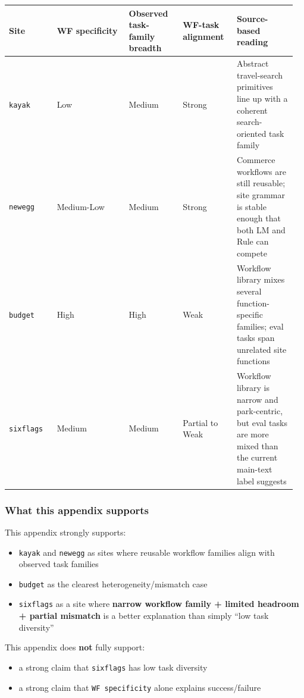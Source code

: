 {\def\LTcaptype{} %
\begin{longtable}[]{@{}>{\raggedright\arraybackslash}p{0.16\linewidth}>{\raggedright\arraybackslash}p{0.24\linewidth}>{\raggedright\arraybackslash}p{0.18\linewidth}>{\raggedright\arraybackslash}p{0.18\linewidth}>{\raggedright\arraybackslash}p{0.20\linewidth}@{}}
\toprule\noalign{}
Site & WF specificity & Observed task-family breadth & WF-task alignment
& Source-based reading \\
\midrule\noalign{}
\endhead
\bottomrule\noalign{}
\endlastfoot
\texttt{kayak} & Low & Medium & Strong & Abstract travel-search
primitives line up with a coherent search-oriented task family \\
\texttt{newegg} & Medium-Low & Medium & Strong & Commerce workflows are
still reusable; site grammar is stable enough that both LM and Rule can
compete \\
\texttt{budget} & High & High & Weak & Workflow library mixes several
function-specific families; eval tasks span unrelated site functions \\
\texttt{sixflags} & Medium & Medium & Partial to Weak & Workflow library
is narrow and park-centric, but eval tasks are more mixed than the
current main-text label suggests \\
\end{longtable}
}

\subsubsection{What this appendix
supports}

This appendix strongly supports:

\begin{itemize}
\tightlist
\item
  \texttt{kayak} and \texttt{newegg} as sites where reusable workflow
  families align with observed task families
\item
  \texttt{budget} as the clearest heterogeneity/mismatch case
\item
  \texttt{sixflags} as a site where \textbf{narrow workflow family +
  limited headroom + partial mismatch} is a better explanation than
  simply ``low task diversity''
\end{itemize}

This appendix does \textbf{not} fully support:

\begin{itemize}
\tightlist
\item
  a strong claim that \texttt{sixflags} has low task diversity
\item
  a strong claim that \texttt{WF\ specificity} alone explains
  success/failure
\end{itemize}



